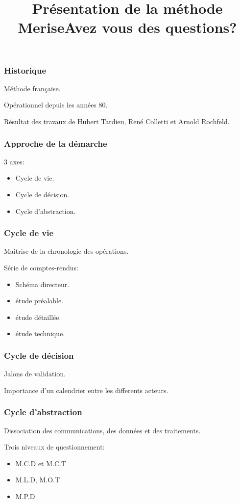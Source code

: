 \documentclass{beamer}
\title{Présentation de la méthode Merise}
\institute{Ynov Bordeaux}
\begin{document}
\begin{frame}
\titlepage
\end{frame}


\begin{frame}
\frametitle{Historique}
Méthode française.

Opérationnel depuis les années 80.

Résultat des travaux de Hubert Tardieu, René Colletti et Arnold Rochfeld.
\end{frame}

\begin{frame}
\frametitle{Approche de la démarche}
3 axes:
\begin{itemize}
    \item Cycle de vie.
    \item Cycle de décision.
    \item Cycle d'abstraction.
\end{itemize}
\end{frame}
\begin{frame}
\frametitle{Cycle de vie}

Maitrise de la chronologie des opérations.

Série de comptes-rendus:

\begin{itemize}
    \item Schéma directeur.
    \item étude préalable.
    \item étude détaillée.
    \item étude technique.
\end{itemize}
\end{frame}

\begin{frame}
\frametitle{Cycle de décision}
Jalons de validation.

Importance d'un calendrier entre les differents acteurs.
\end{frame}

\begin{frame}
\frametitle{Cycle d'abstraction}
Dissociation des communications, des données et des traitements.

Trois niveaux de questionnement:
\begin{itemize}
    \item M.C.D et M.C.T
    \item M.L.D, M.O.T
    \item M.P.D
\end{itemize}

\end{frame}
\begin{frame}
\title{Avez vous des questions?}
\titlepage
\end{frame}
\end{document}
